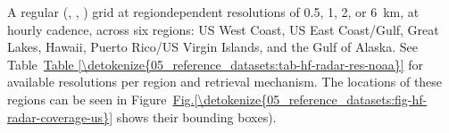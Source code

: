 \documentclass[a4paper,10pt,english]{sphinxmanual}
\begin{document}
\sphinxAtStartPar
{}

\sphinxAtStartPar
A regular (, , ) grid at region\sphinxhyphen{}dependent resolutions of 0.5, 1, 2, or 6 km, at hourly cadence, across six regions: US West Coast, US East Coast/Gulf, Great Lakes, Hawaii, Puerto Rico/US Virgin Islands, and the Gulf of Alaska. See Table \hyperref[\detokenize{05_reference_datasets:tab-hf-radar-res-noaa}]{Table \ref{\detokenize{05_reference_datasets:tab-hf-radar-res-noaa}}} for available resolutions per region and retrieval mechanism. The locations of these regions can be seen in Figure \hyperref[\detokenize{05_reference_datasets:fig-hf-radar-coverage-us}]{Fig.\@ \ref{\detokenize{05_reference_datasets:fig-hf-radar-coverage-us}}} shows their bounding boxes).
\end{document}
